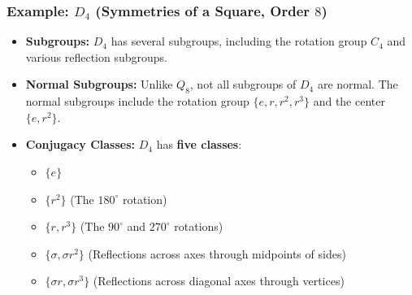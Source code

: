 \documentclass[a4paper,12pt]{article}
\theoremstyle{definition}
\begin{document}
\subsubsection*{Example: $D_4$ (Symmetries of a Square, Order $8$)}

\begin{itemize}
\item \textbf{Subgroups:} $D_4$ has several subgroups, including the rotation group $C_4$ and various reflection subgroups.

\item \textbf{Normal Subgroups:} 
Unlike $Q_8$, not all subgroups of $D_4$ are normal. 
The normal subgroups include the rotation group $\{e, r, r^2, r^3\}$ and the center $\{e, r^2\}$.

\item \textbf{Conjugacy Classes:} $D_4$ has \textbf{five classes}:
\begin{itemize}
\item $\{e\}$
\item $\{r^2\}$ (The $180^\circ$ rotation)
\item $\{r, r^3\}$ (The $90^\circ$ and $270^\circ$ rotations)
\item $\{\sigma, \sigma r^2\}$ (Reflections across axes through midpoints of sides)
\item $\{\sigma r, \sigma r^3\}$ (Reflections across diagonal axes through vertices)
\end{itemize}
\end{itemize}
\end{document}
